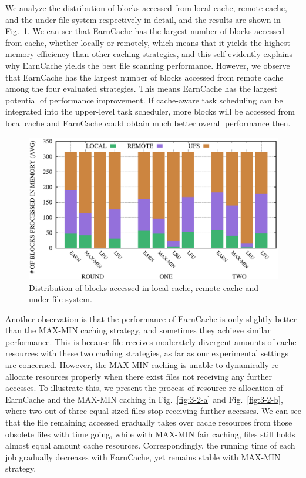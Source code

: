 We analyze the distribution of blocks accessed from local cache, remote cache, and the under file system respectively in detail, and the results are shown in Fig.~\ref{fig:block_count}. We can see that EarnCache has the largest number of blocks accessed from cache, whether locally or remotely, which means that it yields the highest memory efficiency than other caching strategies, and this self-evidently explains why EarnCache yields the best file scanning performance. However, we observe that EarnCache has the largest number of blocks accessed from remote cache among the four evaluated strategies. This means EarnCache has the largest potential of performance improvement. If cache-aware task scheduling can be integrated into the upper-level task scheduler, more blocks will be accessed from local cache and EarnCache could obtain much better overall performance then.

\begin{figure}[!htbp]
    \centering
    \includegraphics[scale=0.4]{figures/block_count_avg.eps}
    \caption{Distribution of blocks accessed in local cache, remote cache and under file system.}
    \label{fig:block_count}
\end{figure}

Another observation is that the performance of EarnCache is only slightly better than the MAX-MIN caching strategy, and sometimes they achieve similar performance. This is because file receives moderately divergent amounts of cache resources with these two caching strategies, as far as our experimental settings are concerned. 
However, the MAX-MIN caching is unable to dynamically re-allocate resources properly when there exist files not receiving any further accesses. 
To illustrate this, we present the process of resource re-allocation of EarnCache and the MAX-MIN caching in Fig.~\ref{fig:3-2-a} and Fig.~\ref{fig:3-2-b}, where two out of three equal-sized files stop receiving further accesses. We can see that the file remaining accessed gradually takes over cache resources from those obsolete files with time going, while with MAX-MIN fair caching, files still holds almost equal amount cache resources.
Correspondingly, the running time of each job gradually decreases with EarnCache, yet remains stable with MAX-MIN strategy.

